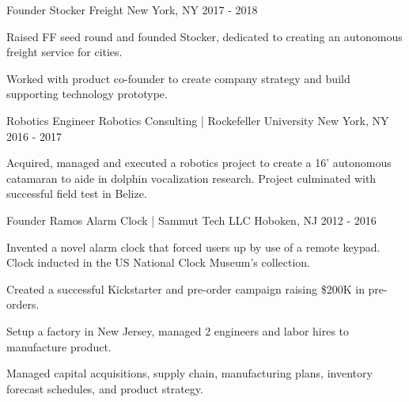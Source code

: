 

\begin{cventries}

  \cventry
    {Founder} %
    {Stocker Freight} %
    {New York, NY} %
    {2017 - 2018} %
    {
      \begin{cvitems} %
        \item {Raised FF seed round and founded Stocker, dedicated to creating
            an autonomous freight service for cities. } 
        \item {Worked with product co-founder to create company strategy and
            build supporting technology prototype.} 
      \end{cvitems}
    }

  \cventry
    {Robotics Engineer} %
    {Robotics Consulting | Rockefeller University} %
    {New York, NY} %
    {2016 - 2017} %
    {
      \begin{cvitems} %
        \item {Acquired, managed and executed a robotics project to create a 16’
        autonomous catamaran to aide in dolphin vocalization research. Project
        culminated with successful field test in Belize.} 
      \end{cvitems}
    }

  \cventry
    {Founder} %
    {Ramos Alarm Clock | Sammut Tech LLC} %
    {Hoboken, NJ} %
    {2012 - 2016} %
    {
      \begin{cvitems} %
        \item {Invented a novel alarm clock that forced users up by use of a 
            remote keypad. Clock inducted in the US National Clock Museum's collection.} 
        \item {Created a successful Kickstarter and
            pre-order campaign raising \$200K in pre-orders.}
        \item {Setup a factory in New Jersey, managed 2 engineers and labor
            hires to manufacture product.}
        \item {Managed capital acquisitions, supply chain, manufacturing plans, inventory
            forecast schedules, and product strategy.}
      \end{cvitems}
    }


\end{cventries}
